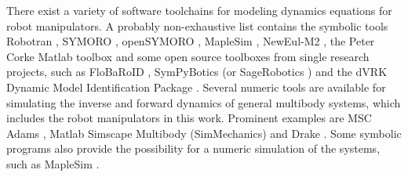 \documentclass[runningheads]{llncs}
\begin{document}
There exist a variety of software toolchains for modeling dynamics equations for robot manipulators.
A probably non-exhaustive list contains the symbolic tools Robotran \cite{FisettePosSasSam2002,SaminFis2013,Docquier2013}, SYMORO \cite{KhalilCre1997}, openSYMORO \cite{KhalilVijKhoMuk2014}, MapleSim \cite{MapleSim}, NewEul-M2 \cite{KurzEbeHenSch2010}, the Peter Corke Matlab toolbox \cite{Corke2011} and some open source toolboxes from single research projects, such as FloBaRoID \cite{BethgeMalTsaCal2017}, SymPyBotics (or SageRobotics \cite{SousaCor2012}) and the dVRK Dynamic Model Identification Package \cite{WangGonMunFis2019}.
Several numeric tools are available for simulating the inverse and forward dynamics of general multibody systems, which includes the robot manipulators in this work.
Prominent examples are MSC Adams \cite{Adams}, Matlab Simscape Multibody (SimMechanics) \cite{SimMechanics} and Drake \cite{Drake}.
Some symbolic programs also provide the possibility for a numeric simulation of the systems, such as MapleSim \cite{MapleSim}.
\end{document}

